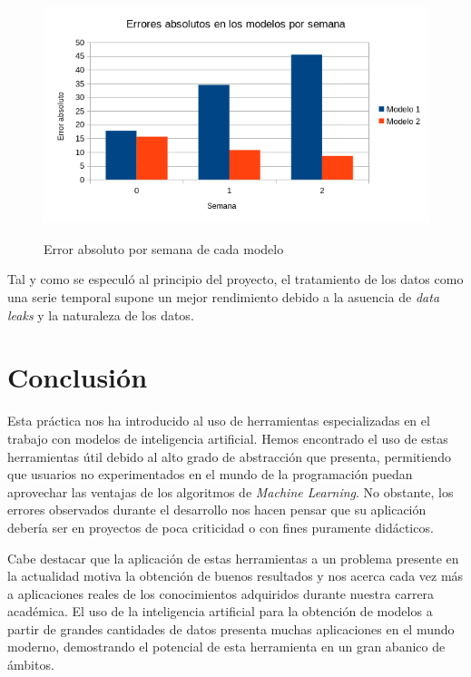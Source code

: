 \documentclass[12pt]{report} %
\begin{document}
\begin{figure}[H]
    \includegraphics[width=0.85\linewidth]{err-abs-week.png}\\
    \caption{\small Error absoluto por semana de cada modelo}
\end{figure}

Tal y como se especuló al principio del proyecto, el tratamiento de los datos como una serie temporal supone un mejor rendimiento debido a la asuencia de \textit{data leaks} y la naturaleza de los datos.

\chapter{Conclusión}
\label{chap:conclusion}

Esta práctica nos ha introducido al uso de herramientas especializadas en el trabajo con modelos de inteligencia artificial. Hemos encontrado el uso de estas herramientas útil debido al alto grado de abstracción que presenta, permitiendo que usuarios no experimentados en el mundo de la programación puedan aprovechar las ventajas de los algoritmos de \textit{Machine Learning}. No obstante, los errores observados durante el desarrollo nos hacen pensar que su aplicación debería ser en proyectos de poca criticidad o con fines puramente didácticos.

Cabe destacar que la aplicación de estas herramientas a un problema presente en la actualidad motiva la obtención de buenos resultados y nos acerca cada vez más a aplicaciones reales de los conocimientos adquiridos durante nuestra carrera académica. El uso de la inteligencia artificial para la obtención de modelos a partir de grandes cantidades de datos presenta muchas aplicaciones en el mundo moderno, demostrando el potencial de esta herramienta en un gran abanico de ámbitos.

\end{document}
